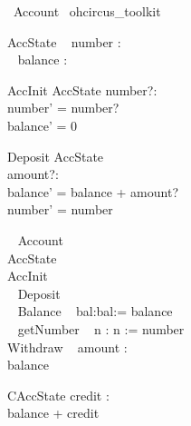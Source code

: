 \documentclass[a4paper,10pt]{article}
\begin{document}
\begin{zsection}
  \SECTION\ Account \parents\ ohcircus\_toolkit
\end{zsection}

\begin{schema}{AccState}
\ohcircpublic ~ number : \nat \\
\ohcircprotected ~ balance : \nat \\
\end{schema}


\begin{schema}{AccInit}
\Delta AccState
number?:\nat\\
\where
number' = number?\\
balance' = 0 
\end{schema}

 
 \begin{schema}{Deposit}
 \Delta AccState\\
 amount?:\nat\\
 \where
 balance' = balance + amount?\\
 number' = number
 \end{schema}

\begin{circus}
  \ohcircclass ~ Account ~ \circdef \circbegin\\  
  \ohcircstate  AccState \\


  \ohcircinitial  AccInit \\
  \ohcircpublic ~ Deposit \\

  \ohcircpublic ~ Balance ~ \circdef  \circres bal:\nat \circspot bal:= balance \\

  \ohcircpublic ~ getNumber ~ \circdef \circres n : \nat \circspot n := number \\

  \ohcircpublic Withdraw ~ \circdef \circval amount : \nat \\
  \circspot  balance \prefixcolon [ amount \leq balance , balance' = balance - amount ]\\

\circend
\end{circus}


\begin{schema}{CAccState}
\ohcircprotected credit : \nat \\
\where
balance + credit 
\end{schema}
\end{document}
